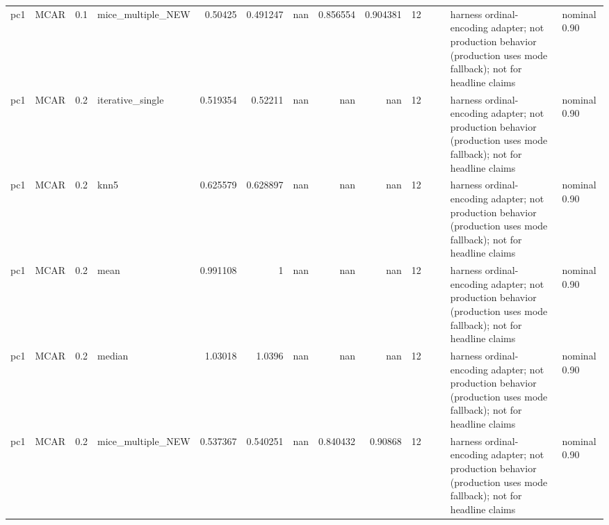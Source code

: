 \begin{table}[ht]
\begin{tabular}{llrlrrrrrrllll}
 pc1                  & MCAR        &         0.1 & mice\_multiple\_NEW &       0.50425  &             0.491247 &               nan        &                       0.856554 &                         0.904381 &        12 &                    &                                         & harness ordinal-encoding adapter; not production behavior (production uses mode fallback); not for headline claims & nominal 0.90              \\
 pc1                  & MCAR        &         0.2 & iterative\_single  &       0.519354 &             0.52211  &               nan        &                     nan        &                       nan        &        12 &                    &                                         & harness ordinal-encoding adapter; not production behavior (production uses mode fallback); not for headline claims & nominal 0.90              \\
 pc1                  & MCAR        &         0.2 & knn5              &       0.625579 &             0.628897 &               nan        &                     nan        &                       nan        &        12 &                    &                                         & harness ordinal-encoding adapter; not production behavior (production uses mode fallback); not for headline claims & nominal 0.90              \\
 pc1                  & MCAR        &         0.2 & mean              &       0.991108 &             1        &               nan        &                     nan        &                       nan        &        12 &                    &                                         & harness ordinal-encoding adapter; not production behavior (production uses mode fallback); not for headline claims & nominal 0.90              \\
 pc1                  & MCAR        &         0.2 & median            &       1.03018  &             1.0396   &               nan        &                     nan        &                       nan        &        12 &                    &                                         & harness ordinal-encoding adapter; not production behavior (production uses mode fallback); not for headline claims & nominal 0.90              \\
 pc1                  & MCAR        &         0.2 & mice\_multiple\_NEW &       0.537367 &             0.540251 &               nan        &                       0.840432 &                         0.90868  &        12 &                    &                                         & harness ordinal-encoding adapter; not production behavior (production uses mode fallback); not for headline claims & nominal 0.90              \\

\end{tabular}
\end{table}
